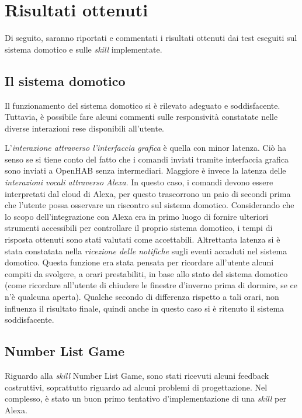 \section{Risultati ottenuti}
\label{sec:Section6.2}

Di seguito, saranno riportati e commentati i risultati ottenuti dai test
eseguiti sul sistema domotico e sulle \textit{skill} implementate.

\subsection{Il sistema domotico}
\label{subsec:Section6.2.1}

Il funzionamento del sistema domotico si è rilevato adeguato e soddisfacente.
Tuttavia, è possibile fare alcuni commenti sulle responsività constatate nelle
diverse interazioni rese disponibili all'utente.

L'\textit{interazione attraverso l'interfaccia grafica} è quella con minor
latenza. Ciò ha senso se si tiene conto del fatto che i comandi inviati tramite
interfaccia grafica sono inviati a OpenHAB senza intermediari. Maggiore è
invece la latenza delle \textit{interazioni vocali attraverso Alexa}. In questo
caso, i comandi devono essere interpretati dal cloud di Alexa, per questo
trascorrono un paio di secondi prima che l'utente possa osservare un riscontro
sul sistema domotico. Considerando che lo scopo dell'integrazione con Alexa era
in primo luogo di fornire ulteriori strumenti accessibili per controllare il
proprio sistema domotico, i tempi di risposta ottenuti sono stati valutati come
accettabili. Altrettanta latenza si è stata constatata nella \textit{ricezione
delle notifiche} sugli eventi accaduti nel sistema domotico. Questa funzione
era stata pensata per ricordare all'utente alcuni compiti da svolgere, a orari
prestabiliti, in base allo stato del sistema domotico (come ricordare
all'utente di chiudere le finestre d'inverno prima di dormire, se ce n'è
qualcuna aperta). Qualche secondo di differenza rispetto a tali orari, non
influenza il risultato finale, quindi anche in questo caso si è ritenuto il
sistema soddisfacente.

\subsection{Number List Game}
\label{subsec:Section6.2.2}

Riguardo alla \textit{skill} Number List Game, sono stati ricevuti alcuni
feedback costruttivi, soprattutto riguardo ad alcuni problemi di progettazione.
Nel complesso, è stato un buon primo tentativo d'implementazione di una
\textit{skill} per Alexa.

